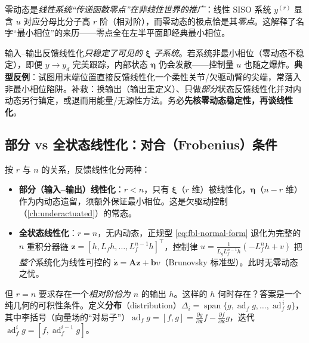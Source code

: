 零动态是\emph{线性系统“传递函数零点”在非线性世界的推广}：线性 SISO 系统 $y^{(r)}$ 显含 $u$ 对应分母比分子高 $r$ 阶（相对阶），而零动态的极点恰是其\emph{零点}。这解释了名字“最小相位”的来历——零点全在左半平面即经典最小相位。

\begin{pitfall}
输入–输出反馈线性化\emph{只稳定了可见的 $\boldsymbol{\xi}$ 子系统}。若系统非最小相位（零动态不稳定），即便 $y\to y_d$ 完美跟踪，内部状态 $\boldsymbol{\eta}$ 仍会发散——控制量 $u$ 也随之爆炸。\textbf{典型反例}：试图用末端位置直接反馈线性化一个柔性关节/欠驱动臂的尖端，常落入非最小相位陷阱。补救：换输出（输出重定义）、只做\emph{部分}状态反馈线性化并对内动态另行镇定，或退而用能量/无源性方法。务必\textbf{先核零动态稳定性，再谈线性化}。
\end{pitfall}

\subsection{部分 vs 全状态线性化：对合（Frobenius）条件}
\label{sec:fbl-full-state}

按 $r$ 与 $n$ 的关系，反馈线性化分两种：

\begin{itemize}
  \item \textbf{部分（输入–输出）线性化}：$r<n$，只有 $\boldsymbol{\xi}$（$r$ 维）被线性化，$\boldsymbol{\eta}$（$n-r$ 维）作为内动态遗留，须额外保证最小相位。这是欠驱动控制（\cref{ch:underactuated}）的常态。
  \item \textbf{全状态线性化}：$r=n$，无内动态，正规型 \cref{eq:fbl-normal-form} 退化为完整的 $n$ 重积分器链 $\mathbf{z}=[h,L_fh,\dots,L_f^{n-1}h]^\top$，控制律 $u=\frac{1}{L_gL_f^{n-1}h}(-L_f^nh+v)$ 把\emph{整个}系统化为线性可控的 $\dot{\mathbf{z}}=\mathbf{A}\mathbf{z}+\mathbf{b}v$（Brunovsky 标准型）。此时无零动态之忧。
\end{itemize}

但 $r=n$ 要求存在一个\emph{相对阶恰为 $n$} 的输出 $h$。这样的 $h$ 何时存在？答案是一个纯几何的可积性条件。定义\textbf{分布}（distribution）$\Delta_i=\operatorname{span}\{g,\operatorname{ad}_f g,\dots,\operatorname{ad}_f^{\,i}g\}$，其中李括号（向量场的“对易子”）$\operatorname{ad}_f g=[f,g]=\frac{\partial g}{\partial\mathbf{x}}f-\frac{\partial f}{\partial\mathbf{x}}g$，迭代 $\operatorname{ad}_f^{i}g=[f,\operatorname{ad}_f^{i-1}g]$。

